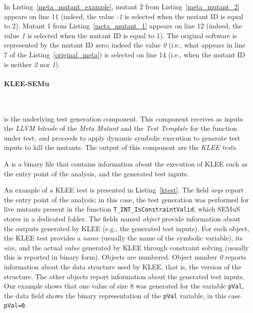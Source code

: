 In Listing~\ref{meta_mutant_example}, mutant 2 from Listing~\ref{meta_mutant_2} appears on line 11 (indeed, the value \emph{-1} is selected when the mutant ID is equal to 2). Mutant 1 from Listing~\ref{meta_mutant_1} appears on line 12 (indeed, the value \emph{1} is selected when the mutant ID is equal to 1). The original software is represented by the mutant ID zero; indeed the value \emph{0} (i.e., what appears in line 7 of the Listing~\ref{original_meta}) is selected on line 14 (i.e., when the mutant ID is neither \emph{2} nor \emph{1}).

\paragraph{KLEE-SEMu}\



 is the underlying test generation component. This component receives as inputs the \emph{LLVM bitcode} of the \emph{Meta Mutant} and the \emph{Test Template} for the function under test, and proceeds to apply dynamic symbolic execution to generate test inputs to kill the mutants. The output of this component are the \emph{KLEE tests}.

A  is a binary file that contains information about the execution of KLEE such as the entry point of the analysis, and the generated test inputs.


An example of a KLEE test is presented in Listing~\ref{ktest}. The field \emph{args} report the entry point of the analysis; in this case, the test generation was performed for live mutants present in the function \texttt{T\_INT\_Is\-Constraint\-Valid}, which SEMuS stores in a dedicated folder. The fields named \emph{object} provide information about the outputs generated by KLEE (e.g., the generated test inputs).
For each object, the KLEE test provides a \emph{name} (usually the name of the symbolic variable), its \emph{size}, and the actual \emph{value} generated by KLEE through constraint solving (usually this is reported in binary form).
Objects are numbered. Object number \emph{0} reports information about the data structure used by KLEE, that is, the version of the structure. The other objects report information about the generated test inputs.
Our example shows that one value of size 8 was generated for the variable \texttt{pVal}, the data field shows the binary representation of the \texttt{pVal} variable, in this case \texttt{pVal=0}.

